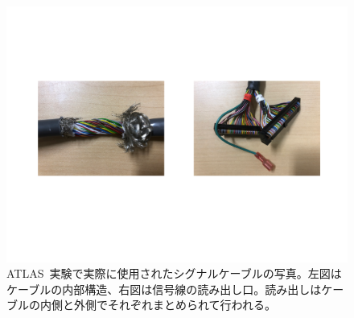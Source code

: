 \begin{figure}[tbp]
    \centering   
    \includegraphics[width=\textwidth,page=1]{img/photo/twistphoto.pdf}
    \caption[ATLAS~実験で実際に使用されたシグナルケーブルの写真]{ATLAS~実験で実際に使用されたシグナルケーブルの写真。左図はケーブルの内部構造、右図は信号線の読み出し口。読み出しはケーブルの内側と外側でそれぞれまとめられて行われる。}
    \label{fig:twist00}
\end{figure}

